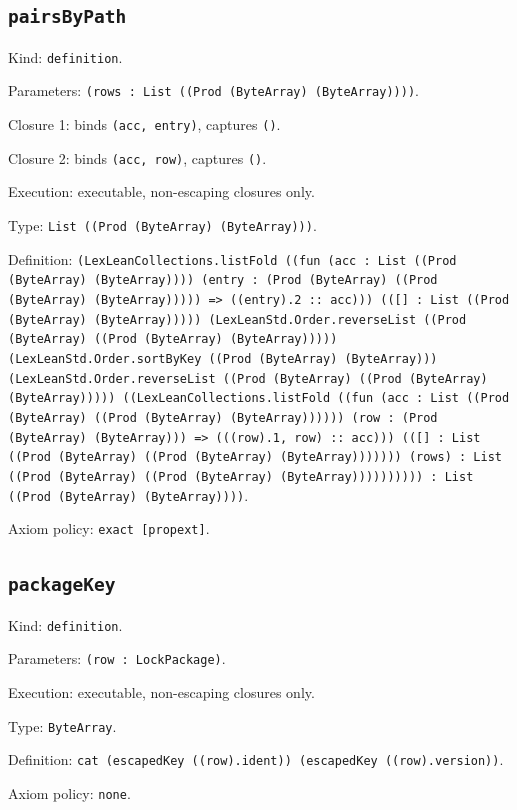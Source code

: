\documentclass[11pt]{article}
\begin{document}
\subsection*{\texttt{pairsByPath}}
\noindent Kind: \texttt{definition}.\par
\noindent Parameters: \texttt{(rows : List ((Prod (ByteArray) (ByteArray))))}.\par
\noindent Closure 1: binds \texttt{(acc, entry)}, captures \texttt{()}.\par
\noindent Closure 2: binds \texttt{(acc, row)}, captures \texttt{()}.\par
\noindent Execution: executable, non-escaping closures only.\par
\noindent Type: \texttt{List ((Prod (ByteArray) (ByteArray)))}.\par
\noindent Definition: \texttt{(LexLeanCollections.listFold ((fun (acc : List ((Prod (ByteArray) (ByteArray)))) (entry : (Prod (ByteArray) ((Prod (ByteArray) (ByteArray))))) => ((entry).2 :: acc))) (([] : List ((Prod (ByteArray) (ByteArray))))) (LexLeanStd.Order.reverseList ((Prod (ByteArray) ((Prod (ByteArray) (ByteArray))))) (LexLeanStd.Order.sortByKey ((Prod (ByteArray) (ByteArray))) (LexLeanStd.Order.reverseList ((Prod (ByteArray) ((Prod (ByteArray) (ByteArray))))) ((LexLeanCollections.listFold ((fun (acc : List ((Prod (ByteArray) ((Prod (ByteArray) (ByteArray)))))) (row : (Prod (ByteArray) (ByteArray))) => (((row).1, row) :: acc))) (([] : List ((Prod (ByteArray) ((Prod (ByteArray) (ByteArray))))))) (rows) : List ((Prod (ByteArray) ((Prod (ByteArray) (ByteArray)))))))))) : List ((Prod (ByteArray) (ByteArray))))}.\par
\noindent Axiom policy: \texttt{exact [propext]}.\par
\subsection*{\texttt{packageKey}}
\noindent Kind: \texttt{definition}.\par
\noindent Parameters: \texttt{(row : LockPackage)}.\par
\noindent Execution: executable, non-escaping closures only.\par
\noindent Type: \texttt{ByteArray}.\par
\noindent Definition: \texttt{cat (escapedKey ((row).ident)) (escapedKey ((row).version))}.\par
\noindent Axiom policy: \texttt{none}.\par
\end{document}
